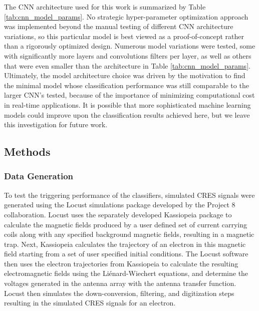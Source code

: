 The CNN architecture used for this work is summarized by Table \ref{tab:cnn_model_params}. No strategic hyper-parameter optimization approach was implemented beyond the manual testing of different CNN architecture variations, so this particular model is best viewed as a proof-of-concept rather than a rigorously optimized design. Numerous model variations were tested, some with significantly more layers and convolutions filters per layer, as well as others that were even smaller than the architecture in Table \ref{tab:cnn_model_params}. Ultimately, the model architecture choice was driven by the motivation to find the minimal model whose classification performance was still comparable to the larger CNN's tested, because of the importance of minimizing computational cost in real-time applications. It is possible that more sophisticated machine learning models could improve upon the classification results achieved here, but we leave this investigation for future work.

\subsection{Methods}
\label{sec:method}


\subsubsection{Data Generation}
\label{sec:datasets}
To test the triggering performance of the classifiers, simulated CRES signals were generated using the Locust simulations package \cite{p8locustpaper, nb_thesis} developed by the Project 8 collaboration. Locust uses the separately developed Kassiopeia package to calculate the magnetic fields produced by a user defined set of current carrying coils along with any specified background magnetic fields, resulting in a magnetic trap. Next, Kassiopeia calculates the trajectory of an electron in this magnetic field starting from a set of user specified initial conditions. The Locust software then uses the electron trajectories from Kassiopeia to calculate the resulting electromagnetic fields using the Li\'{e}nard-Wiechert equations, and determine the voltages generated in the antenna array with the antenna transfer function. Locust then simulates the down-conversion, filtering, and digitization steps resulting in the simulated CRES signals for an electron.

